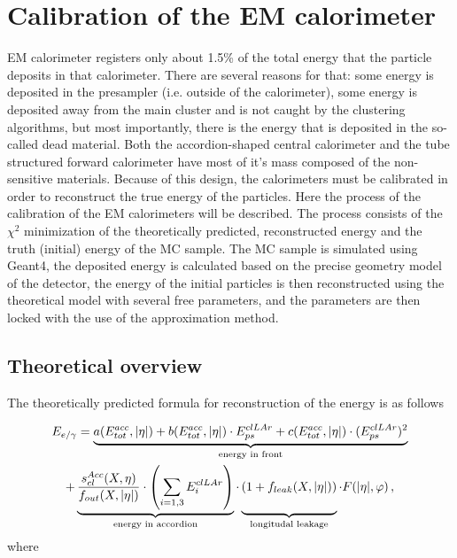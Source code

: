 \chapter{Calibration of the EM calorimeter}
\label{sec:Calibration}

EM calorimeter registers only about 1.5\% of the total energy that the particle deposits in that calorimeter. There are several reasons for that: some energy is deposited in the presampler (i.e. outside of the calorimeter), some energy is deposited away from the main cluster and is not caught by the clustering algorithms, but most importantly, there is the energy that is deposited in the so-called dead material. Both the accordion-shaped central calorimeter and the tube structured forward calorimeter have most of it's mass composed of the non-sensitive materials. Because of this design, the calorimeters must be calibrated in order to reconstruct the  true energy of the particles. Here the process of the calibration of the EM calorimeters will be described. The process consists of the $\chi^{2}$ minimization of the theoretically predicted, reconstructed energy and the truth (initial) energy of the MC sample. The MC sample is simulated using Geant4, the deposited energy is calculated based on the precise geometry model of the detector, the energy of the initial particles is then reconstructed using the theoretical model with several free parameters, and the parameters are then locked with the use of the approximation method.

\section{Theoretical overview}

The theoretically predicted formula for reconstruction of the energy is as follows

\begin{equation}
\label{eq:calib_theory}
\begin{gathered}
E_{e/\gamma} = \underbrace{a(E^{acc}_{tot}, |\eta|) + b (E^{acc}_{tot}, |\eta|) \cdot E^{clLAr}_{ps} + c (E^{acc}_{tot}, |\eta|) \cdot (E^{clLAr}_{ps})^{2}}_\text{energy in front} \\
+ \underbrace{\frac{s^{Acc}_{cl}(X,\eta)}{f_{out}(X,|\eta|)} \cdot \left( \sum\limits_{i=1,3} E^{clLAr}_{i} \right)}_\text{energy in accordion}
 \cdot \underbrace{(1+f_{leak}(X,|\eta|)) \vphantom{\left( \sum\limits_{i=1,3} E^{clLAr}_{i} \right)}}_\text{longitudal leakage}
 \cdot F(|\eta|,\varphi) \,,
\end{gathered}
\end{equation}
where

